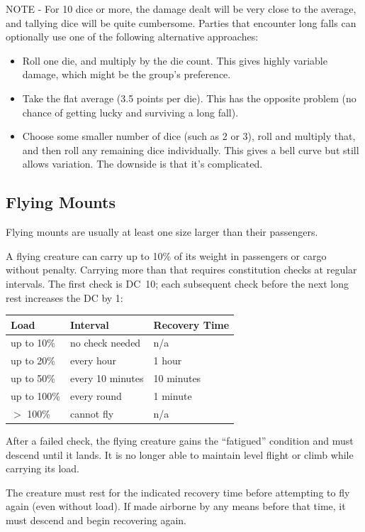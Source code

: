 NOTE - For 10 dice or more, the damage dealt will be very close to the
average, and tallying dice will be quite cumbersome. Parties that
encounter long falls can optionally use one of the following alternative
approaches:
\begin{itemize}
\item Roll one die, and multiply by the die count. This gives highly
variable damage, which might be the group's preference.
\item Take the flat average (3.5 points per die). This has the opposite
problem (no chance of getting lucky and surviving a long fall).
\item Choose some smaller number of dice (such as 2 or 3), roll and multiply
that, and then roll any remaining dice individually. This gives a bell
curve but still allows variation. The downside is that it's complicated.
\end{itemize}

%
\subsection{Flying Mounts}

Flying mounts are usually at least one size larger than their passengers.

A flying creature can carry up to 10\% of its weight in passengers or
cargo without penalty. Carrying more than that requires constitution checks
at regular intervals. The first check is DC~10; each subsequent check before
the next long rest increases the DC by 1:

\begin{tabular}{lll} \hline
\textbf{Load} & \textbf{Interval} & \textbf{Recovery Time} \\ \hline
up to 10\% & no check needed & n/a \\
up to 20\% & every hour & 1 hour \\
up to 50\% & every 10 minutes & 10 minutes \\
up to 100\% & every round & 1 minute \\
$>$ 100\% & cannot fly & n/a \\ \hline
\end{tabular}

After a failed check, the flying creature gains the ``fatigued'' condition
and must descend until it lands. It is no longer able to maintain level
flight or climb while carrying its load.

The creature must rest for the indicated recovery time before attempting to
fly again (even without load). If made airborne by any means before that
time, it must descend and begin recovering again.

